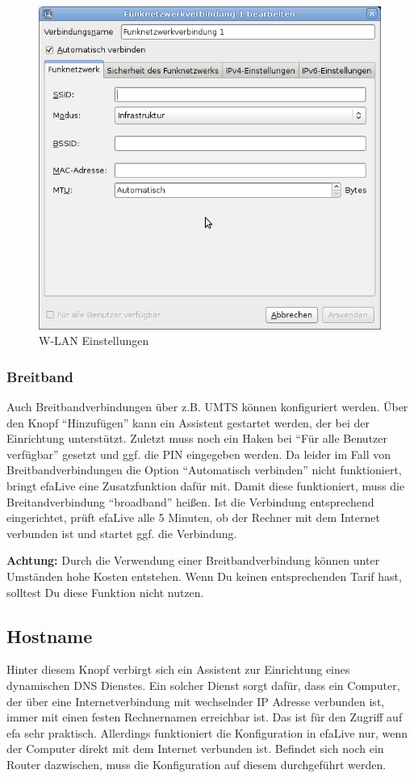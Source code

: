 \documentclass[a4paper,12pt,twoside]{article}
\begin{document}
\begin{figure}
    \centering
    \includegraphics[width=13cm]{efaLivede-img/efaLivede-img24.png}
    \caption{W-LAN Einstellungen}
    \label{fig:wifi}
\end{figure}


\subsubsection{Breitband}
\label{breitband}
Auch Breitbandverbindungen über z.B. UMTS können konfiguriert werden.
Über den Knopf "`Hinzufügen"' kann ein
Assistent gestartet werden, der bei der Einrichtung unterstützt.
Zuletzt muss noch ein Haken bei "`Für alle Benutzer
verfügbar"' gesetzt und ggf. die PIN eingegeben werden. Da
leider im Fall von Breitbandverbindungen die Option
"`Automatisch verbinden"' nicht funktioniert,
bringt efaLive eine Zusatzfunktion dafür mit. Damit diese funktioniert,
muss die Breitandverbindung "`broadband"'
heißen. Ist die Verbindung entsprechend eingerichtet, prüft efaLive
alle 5 Minuten, ob der Rechner mit dem Internet verbunden ist und
startet ggf. die Verbindung.

\bigskip
\textbf{Achtung:} Durch die Verwendung einer Breitbandverbindung können unter
Umständen hohe Kosten entstehen. Wenn Du keinen entsprechenden Tarif
hast, solltest Du diese Funktion nicht nutzen.
\bigskip

\subsection{Hostname}
\label{sct:ddns}
Hinter diesem Knopf verbirgt sich ein Assistent zur Einrichtung eines
dynamischen DNS Dienstes. Ein solcher Dienst sorgt dafür, dass ein
Computer, der über eine Internetverbindung mit wechselnder IP Adresse
verbunden ist, immer mit einen festen Rechnernamen erreichbar ist. Das
ist für den Zugriff auf efa sehr praktisch. Allerdings funktioniert die
Konfiguration in efaLive nur, wenn der Computer direkt mit dem Internet
verbunden ist. Befindet sich noch ein Router dazwischen, muss die
Konfiguration auf diesem durchgeführt werden.
\end{document}

